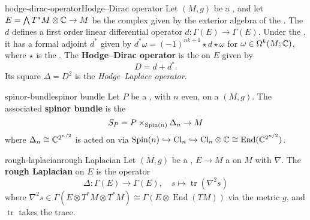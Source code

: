 \begin{topic}{hodge-dirac-operator}{Hodge--Dirac operator}
    Let $(M, g)$ be a , and let $E = \bigwedge T^*M \otimes \mathbb{C} \to M$ be the complex  given by the exterior algebra of the . The  $d$ defines a first order linear differential operator $d : \Gamma(E) \to \Gamma(E)$. Under the , it has a formal adjoint $d^*$ given by $d^* \omega = (-1)^{nk + 1} \star d \star \omega$ for $\omega \in \Omega^k(M; \mathbb{C})$, where $\star$ is the . The \textbf{Hodge--Dirac operator} is the  on $E$ given by
    \[ D = d + d^* . \]
    Its square $\Delta = D^2$ is the \textit{Hodge--Laplace operator}.
\end{topic}

\begin{topic}{spinor-bundle}{spinor bundle}
    Let $P$ be a , with $n$ even, on a  $(M, g)$. The associated \textbf{spinor bundle} is the 
    \[ S_P = P \times_{\textup{Spin}(n)} \Delta_n \to M \]
    where $\Delta_n \cong \mathbb{C}^{2^{n/2}}$ is acted on via $\textup{Spin}(n) \hookrightarrow \textup{Cl}_n \hookrightarrow \textup{Cl}_n \otimes \mathbb{C} \cong \operatorname{End}(\mathbb{C}^{2^{n/2}})$.
\end{topic}

\begin{topic}{rough-laplacian}{rough Laplacian}
    Let $(M, g)$ be a , $E \to M$ a  on $M$ with  $\nabla$. The \textbf{rough Laplacian} on $E$ is the operator
    \[ \Delta : \Gamma(E) \to \Gamma(E), \quad s \mapsto \operatorname{tr}(\nabla^2 s) \]
    where $\nabla^2 s \in \Gamma(E \otimes T^*M \otimes T^*M) \cong \Gamma(E \otimes \operatorname{End}(TM))$ via the metric $g$, and $\operatorname{tr}$ takes the trace.
\end{topic}

